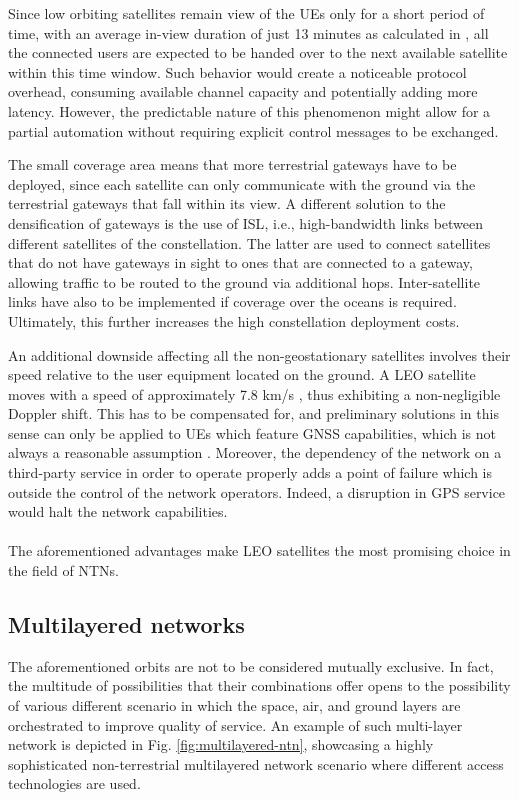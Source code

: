 Since low orbiting satellites remain view of the \ac{UE}s only for a short period of time, with an average in-view duration of just 13 minutes as calculated in \cite{regional-coverage-analysis-leo}, all the connected users are expected to be handed over to the next available satellite within this time window. Such behavior would create a noticeable protocol overhead, consuming available channel capacity and potentially adding more latency. However, the predictable nature of this phenomenon might allow for a partial automation without requiring explicit control messages to be exchanged.

The small coverage area means that more terrestrial gateways have to be deployed, since each satellite can only communicate with the ground via the terrestrial gateways that fall within its view. A different solution to the densification of gateways is the use of \ac{ISL}, i.e., high-bandwidth links between different satellites of the constellation. The latter are used to connect satellites that do not have gateways in sight to ones that are connected to a gateway, allowing traffic to be routed to the ground via additional hops. Inter-satellite links have also to be implemented if coverage over the oceans is required. Ultimately, this further increases the high constellation deployment costs.

An additional downside affecting all the non-geostationary satellites involves their speed relative to the user equipment located on the ground. A \ac{LEO} satellite moves with a speed of approximately 7.8 km/s \cite{leo-definition-theory-facts}, thus exhibiting a non-negligible Doppler shift. This has to be compensated for, and preliminary solutions in this sense can only be applied to \ac{UE}s which feature GNSS capabilities, which is not always a reasonable assumption \cite{satellite-communication-mmwave-giordani, 3gpp-tr-38.821}. Moreover, the dependency of the network on a third-party service in order to operate properly adds a point of failure which is outside the control of the network operators. Indeed, a disruption in GPS service would halt the network capabilities.

\paragraph{}
The aforementioned advantages make \ac{LEO} satellites the most promising choice in the field of \ac{NTN}s.

\subsection{Multilayered networks}
The aforementioned orbits are not to be considered mutually exclusive. In fact, the multitude of possibilities that their combinations offer opens to the possibility of various different scenario in which the space, air, and ground layers are orchestrated to improve quality of service. An example of such multi-layer network is depicted in Fig. \ref{fig:multilayered-ntn}, showcasing a highly sophisticated non-terrestrial multilayered network scenario where different access technologies are used.


